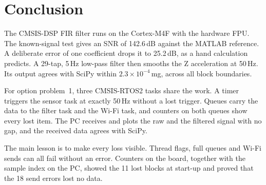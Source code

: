 \documentclass[11pt,a4paper]{article}
\begin{document}
\section{Conclusion}

The CMSIS-DSP FIR filter runs on the Cortex-M4F with the hardware FPU. The
known-signal test gives an SNR of 142.6\,dB against the MATLAB reference. A
deliberate error of one coefficient drops it to 25.2\,dB, as a hand
calculation predicts. A 29-tap, 5\,Hz low-pass filter then smooths the Z
acceleration at 50\,Hz. Its output agrees with SciPy within
$2.3 \times 10^{-4}$\,mg, across all block boundaries.

For option problem~1, three CMSIS-RTOS2 tasks share the work. A timer triggers
the sensor task at exactly 50\,Hz without a lost trigger. Queues carry the
data to the filter task and the Wi-Fi task, and counters on both queues show
every lost item. The PC receives and plots the raw and the filtered signal
with no gap, and the received data agrees with SciPy.

The main lesson is to make every loss visible. Thread flags, full queues and
Wi-Fi sends can all fail without an error. Counters on the board, together
with the sample index on the PC, showed the 11 lost blocks at start-up and
proved that the 18 send errors lost no data.
\end{document}
